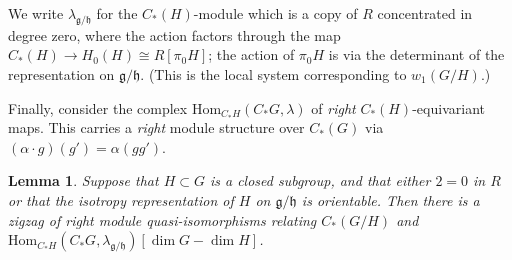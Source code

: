\documentclass{memo-l}
\newtheorem{lemma}[theorem]{Lemma}
\theoremstyle{definition}
\theoremstyle{remark}
\numberwithin{section}{chapter}
\numberwithin{equation}{chapter}
\begin{document}
We write $\lambda_{\mathfrak g/\mathfrak h}$ for the $C_*(H)$-module which is a copy of $R$ concentrated in degree zero, where the action factors through the map $C_*(H) \to H_0(H) \cong R[\pi_0 H]$; the action of $\pi_0 H$ is via the determinant of the representation on $\mathfrak g/\mathfrak h$. (This is the local system corresponding to $w_1(G/H)$.) 

Finally, consider the complex $\text{Hom}_{C_* H}(C_* G, \lambda)$ of \emph{right} $C_*(H)$-equivariant maps. This carries a \emph{right} module structure over $C_*(G)$ via $(\alpha \cdot g)(g') = \alpha(gg')$.

\begin{lemma}\label{PD-for-H}
Suppose that $H \subset G$ is a closed subgroup, and that either $2 = 0$ in $R$ or that the isotropy representation of $H$ on $\mathfrak g/\mathfrak h$ is orientable. Then there is a zigzag of right module quasi-isomorphisms relating $C_*(G/H)$ and $\text{Hom}_{C_* H}(C_* G, \lambda_{\mathfrak g/\mathfrak h})[\dim G - \dim H]$. 
\end{lemma}
\end{document}
